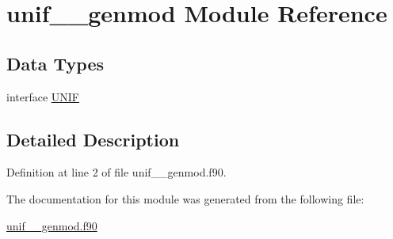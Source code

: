 \hypertarget{classunif____genmod}{\section{unif\+\_\+\+\_\+genmod Module Reference}
\label{classunif____genmod}
}
\subsection*{Data Types}
\begin{DoxyCompactItemize}
\item 
interface \hyperlink{interfaceunif____genmod_1_1UNIF}{U\+N\+I\+F}
\end{DoxyCompactItemize}


\subsection{Detailed Description}


Definition at line 2 of file unif\+\_\+\+\_\+genmod.\+f90.



The documentation for this module was generated from the following file\+:\begin{DoxyCompactItemize}
\item 
\hyperlink{unif____genmod_8f90}{unif\+\_\+\+\_\+genmod.\+f90}\end{DoxyCompactItemize}
